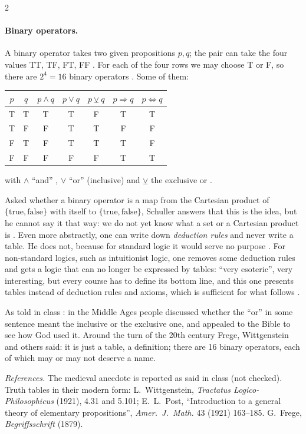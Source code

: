 \begin{paracol}{2}
\paragraph{Binary operators.} A binary operator takes two given propositions $p,q$; the pair can take the
four values TT, TF, FT, FF . For each of the four rows we may choose T or F, so there are
$2^4=16$ binary operators . Some of them:
\begin{center}
\renewcommand{\arraystretch}{1.35}
\begin{tabular}{cc|ccccc}
$p$ & $q$ & $p\wedge q$ & $p\vee q$ & $p\veebar q$ & $p\Rightarrow q$ & $p\Leftrightarrow q$\\\hline
T & T & T & T & F & T & T\\
T & F & F & T & T & F & F\\
F & T & F & T & T & T & F\\
F & F & F & F & F & T & T
\end{tabular}
\end{center}
with $\wedge$ ``and'' , $\vee$ ``or'' (inclusive) and $\veebar$ the exclusive or
.

\begin{coursenote}
Asked whether a binary operator is a map from the Cartesian product of $\{\text{true},\text{false}\}$ with
itself to $\{\text{true},\text{false}\}$, Schuller answers that this is the idea, but he cannot say it that way:
we do not yet know what a set or a Cartesian product is . Even more abstractly, one can
write down \emph{deduction rules} and never write a table. He does not, because for standard logic it would
serve no purpose . For non-standard logics, such as intuitionist logic, one removes some
deduction rules and gets a logic that can no longer be expressed by tables: ``very esoteric'', very
interesting, but every course has to define its bottom line, and this one presents tables instead of
deduction rules and axioms, which is sufficient for what follows .
\end{coursenote}

\begin{history}
As told in class : in the Middle Ages people discussed whether the ``or'' in some sentence meant
the inclusive or the exclusive one, and appealed to the Bible to see how God used it. Around the turn of the
20th century Frege, Wittgenstein and others said: it is just a table, a definition; there are 16 binary
operators, each of which may or may not deserve a name.\par
\smallskip
\emph{References.} The medieval anecdote is reported as said in class (not checked). Truth tables in their
modern form: L.~Wittgenstein, \emph{Tractatus Logico-Philosophicus} (1921), 4.31 and 5.101; E.~L.~Post,
``Introduction to a general theory of elementary propositions'', \emph{Amer.\ J.\ Math.} 43 (1921) 163--185.
G.~Frege, \emph{Begriffsschrift} (1879).
\end{history}


\end{paracol}
